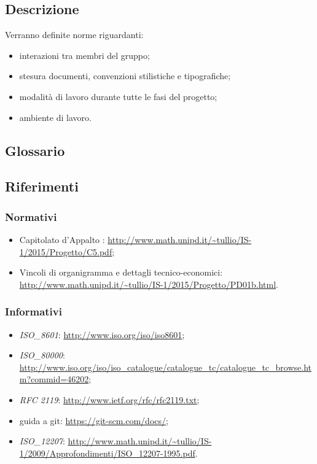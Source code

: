 \documentclass[12pt,a4paper]{article}
\begin{document}
\subsection{Descrizione}
Verranno definite norme riguardanti:
\begin{itemize}
	\item interazioni tra membri del gruppo;
	\item stesura documenti, convenzioni stilistiche e tipografiche;
	\item modalità di lavoro durante tutte le fasi del progetto;
	\item ambiente di lavoro.
\end{itemize}

\subsection{Glossario}\label{glossario}
\glossarioPrint

\subsection{Riferimenti}\label{riferimenti}

\subsubsection{Normativi}
\begin{itemize}
	\item Capitolato d’Appalto \prjL: \url{http://www.math.unipd.it/~tullio/IS-1/2015/Progetto/C5.pdf};
	\item Vincoli di organigramma e dettagli tecnico-economici: \url{http://www.math.unipd.it/~tullio/IS-1/2015/Progetto/PD01b.html}.
\end{itemize}

\subsubsection{Informativi}
\begin{itemize}
	\item \textit{ISO\_8601}: \url{http://www.iso.org/iso/iso8601};
	\item \textit{ISO\_80000}: \url{http://www.iso.org/iso/iso_catalogue/catalogue_tc/catalogue_tc_browse.htm?commid=46202};
	\item \textit{RFC 2119}: {\url{http://www.ietf.org/rfc/rfc2119.txt}};
	\item guida a git: \url{https://git-scm.com/docs/};
	\item \textit{ISO\_12207}: \url{http://www.math.unipd.it/~tullio/IS-1/2009/Approfondimenti/ISO_12207-1995.pdf}.
\end{itemize}
\end{document}
